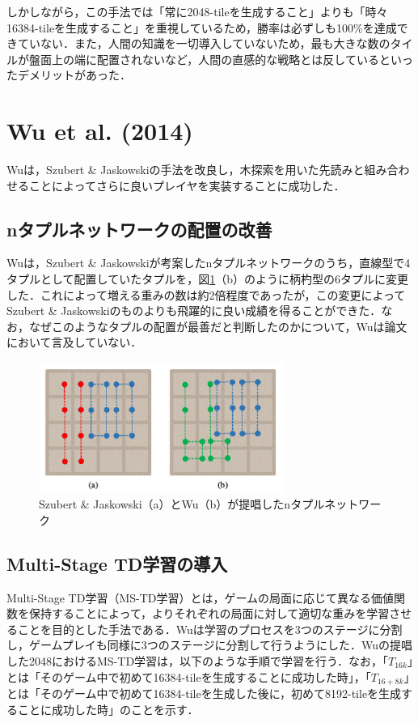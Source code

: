 \documentclass{suribt}
\begin{document}
しかしながら，この手法では「常に2048-tileを生成すること」よりも「時々16384-tileを生成すること」を重視しているため，勝率は必ずしも100\%を達成できていない．また，人間の知識を一切導入していないため，最も大きな数のタイルが盤面上の端に配置されないなど，人間の直感的な戦略とは反しているといったデメリットがあった．

\section{Wu et al. (2014)}
Wuは，Szubert \& Jaskowskiの手法を改良し，木探索を用いた先読みと組み合わせることによってさらに良いプレイヤを実装することに成功した．

\subsection{nタプルネットワークの配置の改善}
Wuは，Szubert \& Jaskowskiが考案したnタプルネットワークのうち，直線型で4タプルとして配置していたタプルを，図\ref{figure_002}（b）のように柄杓型の6タプルに変更した．これによって増える重みの数は約2倍程度であったが，この変更によってSzubert \& Jaskowskiのものよりも飛躍的に良い成績を得ることができた．なお，なぜこのようなタプルの配置が最善だと判断したのかについて，Wuは論文において言及していない．

\begin{figure}[t]
	\begin{center}
	\includegraphics[width=8cm]{figure_002.png}
	\caption{Szubert \& Jaskowski（a）とWu（b）が提唱したnタプルネットワーク}
	\label{figure_002}
	\end{center}
\end{figure}

\subsection{Multi-Stage TD学習の導入}
Multi-Stage TD学習（MS-TD学習）とは，ゲームの局面に応じて異なる価値関数を保持することによって，よりそれぞれの局面に対して適切な重みを学習させることを目的とした手法である．Wuは学習のプロセスを3つのステージに分割し，ゲームプレイも同様に3つのステージに分割して行うようにした．Wuの提唱した2048におけるMS-TD学習は，以下のような手順で学習を行う．なお，「$T_{16k}$」とは「そのゲーム中で初めて16384-tileを生成することに成功した時」，「$T_{16+8k}$」とは「そのゲーム中で初めて16384-tileを生成した後に，初めて8192-tileを生成することに成功した時」のことを示す．
\end{document}
